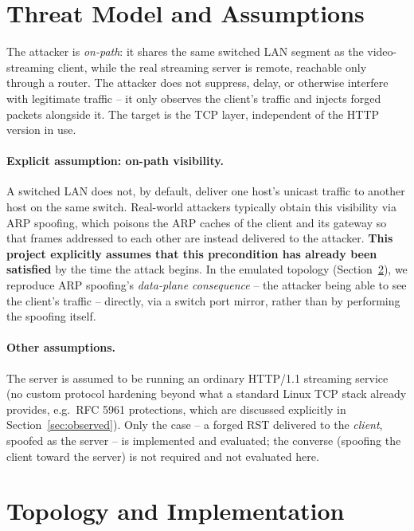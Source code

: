 \documentclass[11pt]{article}
\begin{document}
\section{Threat Model and Assumptions}
\label{sec:threat}

The attacker is \emph{on-path}: it shares the same switched LAN segment
as the video-streaming client, while the real streaming server is
remote, reachable only through a router. The attacker does not suppress,
delay, or otherwise interfere with legitimate traffic -- it only
observes the client's traffic and injects forged packets alongside it.
The target is the TCP layer, independent of the HTTP version in use.

\paragraph{Explicit assumption: on-path visibility.} A switched LAN does
not, by default, deliver one host's unicast traffic to another host on
the same switch. Real-world attackers typically obtain this visibility
via ARP spoofing, which poisons the ARP caches of the client and its
gateway so that frames addressed to each other are instead delivered to
the attacker. \textbf{This project explicitly assumes that this
precondition has already been satisfied} by the time the attack begins.
In the emulated topology (Section~\ref{sec:impl}), we reproduce ARP spoofing's
\emph{data-plane consequence} -- the attacker being able to see the
client's traffic -- directly, via a switch port mirror, rather than by
performing the spoofing itself.

\paragraph{Other assumptions.} The server is assumed to be running an
ordinary HTTP/1.1 streaming service (no custom protocol hardening beyond
what a standard Linux TCP stack already provides, e.g.\ RFC 5961
protections, which are discussed explicitly in
Section~\ref{sec:observed}). Only the case -- a forged RST
delivered to the \emph{client}, spoofed as the server -- is implemented
and evaluated; the converse (spoofing the client toward the server) is not required and not evaluated here.

\section{Topology and Implementation}
\label{sec:impl}
\end{document}
